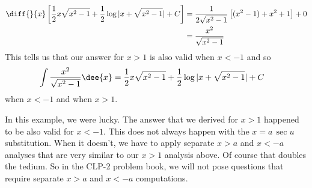 \begin{eg}
\begin{itemize}
\begin{align*}
\diff{}{x} \left[ \frac{1}{2}x\sqrt{x^2-1} + \frac{1}{2}\log| x +\sqrt{x^2-1}| +C
\right]
&= \frac{1}{2\sqrt{x^2-1}} \left[(x^2-1) + x^2 + 1 \right]+0\\
&= \frac{x^2}{\sqrt{x^2-1}}
\end{align*}
This tells us that our answer for $x>1$ is also valid when $x<-1$ and so
\begin{align*}
\int \frac{x^2}{\sqrt{x^2-1}} \dee{x}
&= \frac{1}{2}x\sqrt{x^2-1} + \frac{1}{2}\log| x +\sqrt{x^2-1}| +C
\end{align*}
when $x<-1$ and when $x>1$.
\end{itemize}

In this example, we were lucky. The answer that we derived for $x>1$ happened
to be also valid for $x<-1$. This does not always happen with the
$x=a\,\sec u$ substitution. When it doesn't, we have to apply separate
$x>a$ and $x<-a$ analyses that are very similar to our $x>1$ analysis
above. Of course that doubles the tedium. So in the CLP-2 problem book,
we will not pose questions that require separate $x>a$ and $x<-a$ computations.

\end{eg}


